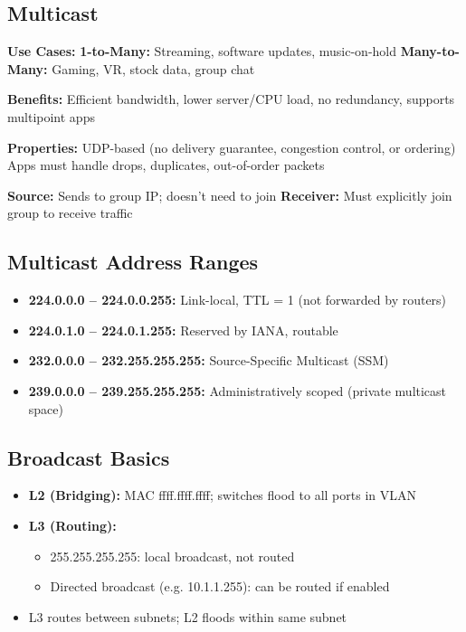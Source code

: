 \begin{multicols*}{5}
		\section{Multicast}
		\textbf{Use Cases:}  
		\textbf{1-to-Many:} Streaming, software updates, music-on-hold  
		\textbf{Many-to-Many:} Gaming, VR, stock data, group chat  
		
		\textbf{Benefits:} Efficient bandwidth, lower server/CPU load, no redundancy, supports multipoint apps  
		
		\textbf{Properties:}  
		UDP-based (no delivery guarantee, congestion control, or ordering)  
		Apps must handle drops, duplicates, out-of-order packets  
		
		\textbf{Source:} Sends to group IP; doesn't need to join  
		\textbf{Receiver:} Must explicitly join group to receive traffic 
		
		\subsection{Multicast Address Ranges}
		\begin{itemize}
			\item \textbf{224.0.0.0 – 224.0.0.255:} Link-local, TTL = 1 (not forwarded by routers)
			\item \textbf{224.0.1.0 – 224.0.1.255:} Reserved by IANA, routable
			\item \textbf{232.0.0.0 – 232.255.255.255:} Source-Specific Multicast (SSM)
			\item \textbf{239.0.0.0 – 239.255.255.255:} Administratively scoped (private multicast space)
		\end{itemize} 
		
		\subsection{Broadcast Basics}
		\begin{itemize}
			\item \textbf{L2 (Bridging):} MAC ffff.ffff.ffff; switches flood to all ports in VLAN
			\item \textbf{L3 (Routing):}
			\begin{itemize}
				\item 255.255.255.255: local broadcast, not routed
				\item Directed broadcast (e.g. 10.1.1.255): can be routed if enabled
			\end{itemize}
			\item L3 routes between subnets; L2 floods within same subnet
		\end{itemize}
		

\end{multicols*}
